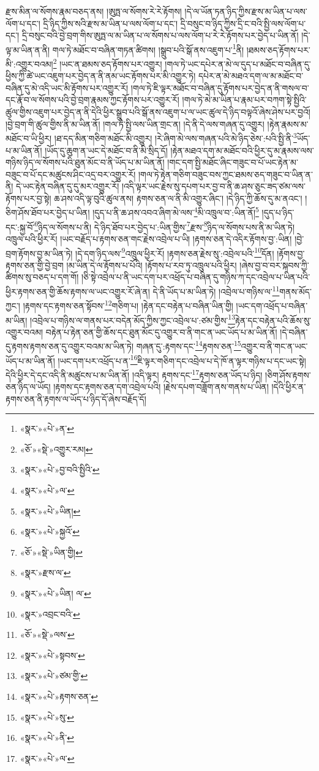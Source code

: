 རྫས་མིན་ལ་སོགས་རྣམ་བཅད་ནས། །ཨུཏྤ་ལ་སོགས་རེ་རེ་རྟོགས། །དེ་ལ་ཡོན་ཏན་ཉིད་ཀྱིས་རྫས་མ་ཡིན་པ་ལས་ལོག་པ་དང་། དྲི་ཉིད་ཀྱིས་སའི་རྫས་མ་ཡིན་པ་ལས་ལོག་པ་དང་། དྲི་བསུང་བ་ཉིད་ཀྱིས་དྲི་ང་བའི་སྤྱི་ལས་ལོག་པ་དང་། དྲི་བསུང་བའི་བྱེ་བྲག་གིས་ཨུཏྤ་ལ་མ་ཡིན་པ་ལ་སོགས་པ་ལས་ལོག་པ་རེ་རེ་རྟོགས་པར་བྱེད་པ་ཡིན་ནོ། །དེ་ལྟ་མ་ཡིན་ན་ནི། གལ་ཏེ་མཐོང་བ་བཞིན་གཏན་ཚིགས། །སྒྲུབ་པའི་སྒོ་ནས་འཇུག་པ་\footnote{«སྣར་»«པེ་»ན་}ནི། །ཐམས་ཅད་རྟོགས་པར་མི་:འགྱུར་བའམ།\footnote{«ཅོ་»«སྡེ་»འགྱུར་རམ།} །ཡང་ན་ཐམས་ཅད་རྟོགས་པར་འགྱུར། །གལ་ཏེ་ཡང་དཔེར་ན་མེ་ལ་དུད་པ་མཐོང་བ་བཞིན་དུ་ཕྱིས་ཀྱི་ཚེ་ཡང་འཇུག་པར་བྱེད་ན་ནི་ནམ་ཡང་རྟོགས་པར་མི་འགྱུར་ཏེ། དཔེར་ན་མེ་མཐའ་དག་ལ་མ་མཐོང་བ་བཞིན་དུ་མེ་འདི་ཡང་མི་རྟོགས་པར་འགྱུར་རོ། །གལ་ཏེ་ཇི་ལྟར་མཐོང་བ་བཞིན་དུ་རྟོགས་པར་བྱེད་ན་ནི་གསལ་བ་དང་རྣོ་བ་ལ་སོགས་པའི་བྱེ་བྲག་རྣམས་ཀྱང་རྟོགས་པར་འགྱུར་རོ། །གལ་ཏེ་མེ་མ་ཡིན་པ་རྣམ་པར་བཀག་སྟེ་སྤྱིའི་ཚུལ་གྱིས་འཇུག་པར་བྱེད་ན་ནི་དེའི་ཕྱིར་སྒྲུབ་པའི་སྒོ་ནས་འཇུག་པ་ལ་ཡང་ཚུལ་དེ་ཉིད་བལྟའོ་ཞེས་ཤེས་པར་བྱའོ། །བྱེ་བྲག་གི་ཚུལ་གྱིས་ནི་མ་ཡིན་ནོ། །གལ་ཏེ་སྤྱི་ལས་ཡིན་གྲང་ན། །དེ་ནི་དེ་ལས་གཞན་དུ་འགྱུར། །རྟེན་རྣམས་མ་མཐོང་བ་ཡི་ཕྱིར། །ཐ་དད་མིན་གཅིག་མཐོང་མི་འགྱུར། །རེ་ཞིག་མེ་ལས་གཞན་པའི་མེ་ཉིད་ཅེས་:པའི་སྤྱི་ནི་\footnote{«སྣར་»«པེ་»བྱ་བའི་སྤྱིའི་}ཡོད་པ་མ་ཡིན་ནོ། །ཡོད་དུ་ཆུག་ན་ཡང་དེ་མཐོང་བ་ནི་མི་སྲིད་དོ། །རྟེན་མཐའ་དག་མ་མཐོང་བའི་ཕྱིར་དུ་མ་རྣམས་ལས་གཉིས་ཉིད་ལ་སོགས་པའི་ཐུན་མོང་བ་ནི་ཡོད་པ་མ་ཡིན་ནོ། །གང་དག་སྤྱི་མཐོང་ཞིང་གཟུང་བ་པོ་ཡང་རྟེན་མ་བཟུང་བ་པོ་དང་མཚུངས་ཤིང་འདྲ་བར་འགྱུར་རོ། །གལ་ཏེ་རྟེན་གཅིག་བཟུང་བས་ཀྱང་ཐམས་ཅད་གཟུང་བ་ཡིན་ན་ནི། དེ་ཡང་རྟེན་བཞིན་དུ་དུ་མར་འགྱུར་རོ། །འདི་ལྟར་ཡང་རྗེས་སུ་དཔག་པར་བྱ་བ་ནི་ཆ་ཤས་ཅུང་ཟད་ཙམ་ལས་རྟོགས་པར་བྱ་སྟེ། ཆ་ཤས་འདི་ལྟ་བུའི་ཚུལ་ནས། རྟགས་ཅན་ལ་ནི་མི་འགྱུར་ཞིང་། །དེ་ཉིད་ཀྱི་ཆོས་དུ་མ་ནའང་། །ཅིག་ཤོས་ཐོབ་པར་བྱེད་པ་ཡིན། །དུད་པ་ནི་ཆ་ཤས་འབའ་ཞིག་མེ་ལས་\footnote{«སྣར་»«པེ་»ལ་}མི་འཁྲུལ་བ་:ཡིན་ནོ།\footnote{«སྣར་»«པེ་»ཡིན།} །དུད་པ་ཉིད་དང་:སྐྱ་བོ་\footnote{«སྣར་»«པེ་»སྐྱའོ་}ཉིད་ལ་སོགས་པ་ནི། དེ་ཉིད་ཐོབ་པར་བྱེད་པ་:ཡིན་གྱིས་\footnote{«ཅོ་»«སྡེ་»ཡིན་གྱི། }རྫས་\footnote{«སྣར་»རྫས་ལ་}ཉིད་ལ་སོགས་པས་ནི་མ་ཡིན་ཏེ། འཁྲུལ་པའི་ཕྱིར་རོ། །ཡང་བརྗོད་པ་རྟགས་ཅན་གང་རྗེས་འབྲེལ་པ་ཡི། །རྟགས་ཅན་དེ་འདིར་རྟོགས་བྱ་:ཡིན། །བྱེ་བྲག་རྟོགས་བྱ་མ་ཡིན་ཏེ། །དེ་དག་ཉིད་ལས་\footnote{«སྣར་»«པེ་»ཡིན། ལ་}འཁྲུལ་ཕྱིར་རོ། །རྟགས་ཅན་རྗེས་སུ་:འབྲེལ་པའི་\footnote{«སྣར་»འབྲང་བའི་}དོན། །རྟོགས་བྱ་རྟགས་ཅན་གྱི་བྱེ་བྲག །མ་ཡིན་དེ་ལ་རྟོགས་པ་པོའི། །རྟོགས་པ་རབ་ཏུ་འཁྲུལ་པའི་ཕྱིར། །ཞེས་བྱ་བ་བར་སྐབས་ཀྱི་ཚིགས་སུ་བཅད་པ་དག་གོ། །ཅི་སྟེ་འབྲེལ་པ་ནི་ཡང་དག་པར་འཕྲོད་པ་བཞིན་དུ་གཉིས་ཀ་དང་འབྲེལ་པ་ཡིན་པའི་ཕྱིར་རྟགས་ཅན་གྱི་ཆོས་རྟགས་ལ་ཡང་འགྱུར་རོ་ཞེ་ན། དེ་ནི་ཡོད་པ་མ་ཡིན་ཏེ། །འབྲེལ་པ་གཉིས་ལ་\footnote{«ཅོ་»«སྡེ་»ལས་}གནས་མོད་ཀྱང་། །རྟགས་དང་རྟགས་ཅན་སྟོབས་\footnote{«སྣར་»«པེ་»སྟབས་}གཅིག་པ། །རྟེན་དང་བརྟེན་པ་བཞིན་ཡིན་གྱི། །ཡང་དག་འཕྲོད་པ་བཞིན་མ་ཡིན། །འབྲེལ་པ་གཉིས་ལ་གནས་པར་བདེན་མོད་ཀྱིས་ཀྱང་འབྲེལ་པ་:ཙམ་གྱིས་\footnote{«སྣར་»«པེ་»ཙམ་གྱི་}རྟེན་དང་བརྟེན་པའི་ཆོས་སུ་འགྱུར་བའམ། བརྟེན་པ་རྟེན་ཅན་གྱི་ཆོས་དང་ཐུན་མོང་དུ་འགྱུར་བ་ནི་གང་ན་ཡང་ཡོད་པ་མ་ཡིན་ནོ། །དེ་བཞིན་དུ་རྟགས་རྟགས་ཅན་དུ་འགྱུར་བའམ་མ་ཡིན་ཏེ། གཞན་དུ་:རྟགས་དང་\footnote{«སྣར་»«པེ་»རྟགས་ཅན་}རྟགས་ཅན་\footnote{«སྣར་»«པེ་»སུ་}འགྱུར་བ་ནི་གང་ན་ཡང་ཡོད་པ་མ་ཡིན་ནོ། །ཡང་དག་པར་འཕྲོད་པ་ན་\footnote{«སྣར་»«པེ་»ནི་}ཇི་ལྟར་གཅིག་དང་འབྲེལ་པ་དེ་ཁོ་ན་ལྟར་གཉིས་པ་དང་ཡང་སྟེ། དེའི་ཕྱིར་དེ་དང་འདི་ནི་མཚུངས་པ་མ་ཡིན་ནོ། །འདི་ལྟར། རྟགས་དང་\footnote{«སྣར་»«པེ་»ལ་}རྟགས་ཅན་ཡོད་པ་ཉིད། །ཅིག་ཤོས་རྟགས་ཅན་ཉིད་ལ་ཡོད། །རྟགས་དང་རྟགས་ཅན་དག་འབྲེལ་པའི། །རྗེས་དཔག་བཟློག་ནས་གནས་པ་ཡིན། །དེའི་ཕྱིར་ན་རྟགས་ཅན་ནི་རྟགས་ལ་ཡོད་པ་ཉིད་དོ་ཞེས་བརྗོད་དོ། 
